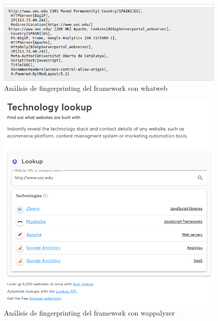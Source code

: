 \documentclass[10pt,a4paper]{article}
\begin{document}
\begin{figure}[h!]
  \centering
  \includegraphics[scale=0.5]{whatweb.png}
  \caption{Análisis de fingerprinting del framework con whatweb}
  \label{fig:otg-info-008-1}
\end{figure}

\begin{figure}[h!]
  \centering
  \includegraphics[scale=0.5]{wappalyzer.png}
  \caption{Análisis de fingerprinting del framework con wappalyzer}
  \label{fig:otg-info-008-2}
\end{figure}
\end{document}
